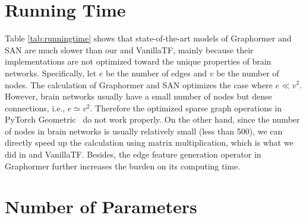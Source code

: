 \section{Running Time}
\label{app:time}
Table \ref{tab:runningtime} shows that state-of-the-art models of Graphormer and SAN are much slower than our \methodtable and VanillaTF, mainly because their implementations are not optimized toward the unique properties of brain networks. Specifically, let $e$ be the number of edges and $v$ be the number of nodes. The calculation of Graphormer and SAN optimizes the case where $e \ll v^2$. However, brain networks usually have a small number of nodes but dense connections, i.e., $e \simeq v^2$. Therefore the optimized sparse graph operations in PyTorch Geometric~\citep{Fey/Lenssen/2019} do not work properly. On the other hand, since the number of nodes in brain networks is usually relatively small (less than 500), we can directly speed up the calculation using matrix multiplication, which is what we did in \methodtable and VanillaTF. Besides, the edge feature generation operator in Graphormer further increases the burden on its computing time.


\begin{table}[htbp]
\centering
\small
\caption{Running time with different graph transformer methods.}
\label{tab:runningtime}
\end{table}

\section{Number of Parameters}
\label{app:para}

\begin{table}[htbp]
\centering
\small
\caption{The number of parameters in different models.}
\label{tab:paras}
\end{table}


